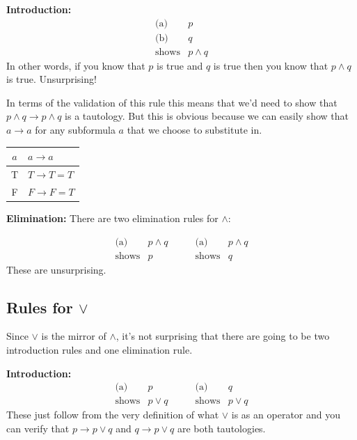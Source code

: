 \documentclass[11pt]{article}
\begin{document}
\noindent\textbf{Introduction:}
\[
  \begin{array}{rl}
    \text{(a)} & p \\
    \text{(b)} & q \\
    \hline
    \text{shows} & p \wedge q
  \end{array}
\]
In other words, if you know that $p$ is true and $q$ is true then you know that $p \wedge q$ is true. Unsurprising!

In terms of the validation of this rule this means that we'd need to show that $p \wedge q \to p \wedge q$ is a tautology. But this is obvious because we can easily show that $a \to a$ for any subformula $a$ that we choose to substitute in.

\begin{center}
\begin{tabular}{cl}
\toprule
$a$ & $a \to a$ \\
\midrule
T & $T \to T = T$ \\
F & $F \to F = T$ \\
\bottomrule
\end{tabular}
\end{center}

\noindent\textbf{Elimination:}
There are two elimination rules for $\wedge$:

\[
  \begin{array}{rl}
    \text{(a)} & p \wedge q \\
    \hline
    \text{shows} & p
  \end{array}
  \qquad
  \begin{array}{rl}
    \text{(a)} & p \wedge q \\
    \hline
    \text{shows} & q
  \end{array}
\]
These are unsurprising.

\subsection{\texorpdfstring{Rules for $\vee$}{Rules for disjunction}}

Since $\vee$ is the mirror of $\wedge$, it's not surprising that there are going to be two introduction rules and one elimination rule.

\noindent\textbf{Introduction:}
\[
  \begin{array}{rl}
    \text{(a)} & p \\
    \hline
    \text{shows} & p \vee q
  \end{array}
  \qquad
  \begin{array}{rl}
    \text{(a)} & q \\
    \hline
    \text{shows} & p \vee q
  \end{array}
\]
These just follow from the very definition of what $\vee$ is as an operator and you can verify that $p \to p \vee q$ and $q \to p \vee q$ are both tautologies.
\end{document}
